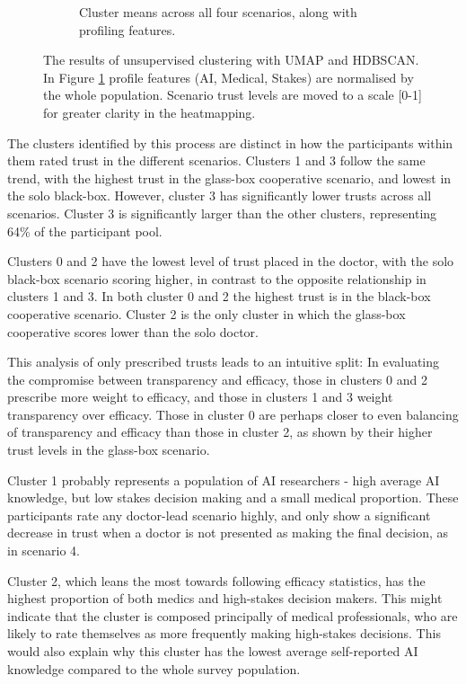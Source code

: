 \documentclass[manuscript,screen,review]{acmart}
\begin{document}
\begin{figure}
\begin{subfigure}{0.55\textwidth}
  \caption{Cluster means across all four scenarios, along with profiling features.}
  \label{fig:cluster_means}
\end{subfigure}
\caption{The results of unsupervised clustering with UMAP and HDBSCAN. In Figure \ref{fig:cluster_means} profile features (AI, Medical, Stakes) are normalised by the whole population. Scenario trust levels are moved to a scale [0-1] for greater clarity in the heatmapping.}
\label{fig:test}
\end{figure}

The clusters identified by this process are distinct in how the participants within them rated trust in the different scenarios. Clusters 1 and 3 follow the same trend, with the highest trust in the glass-box cooperative scenario, and lowest in the solo black-box. However, cluster 3 has significantly lower trusts across all scenarios. Cluster 3 is significantly larger than the other clusters, representing 64\% of the participant pool.

Clusters 0 and 2 have the lowest level of trust placed in the doctor, with the solo black-box scenario scoring higher, in contrast to the opposite relationship in clusters 1 and 3. In both cluster 0 and 2 the highest trust is in the black-box cooperative scenario. Cluster 2 is the only cluster in which the glass-box cooperative scores lower than the solo doctor.

This analysis of only prescribed trusts leads to an intuitive split: In evaluating the compromise between transparency and efficacy, those in clusters 0 and 2 prescribe more weight to efficacy, and those in clusters 1 and 3 weight transparency over efficacy. Those in cluster 0 are perhaps closer to even balancing of transparency and efficacy than those in cluster 2, as shown by their higher trust levels in the glass-box scenario.

Cluster 1 probably represents a population of AI researchers - high average AI knowledge, but low stakes decision making and a small medical proportion. These participants rate any doctor-lead scenario highly, and only show a significant decrease in trust when a doctor is not presented as making the final decision, as in scenario 4.

Cluster 2, which leans the most towards following efficacy statistics, has the highest proportion of both medics and high-stakes decision makers. This might indicate that the cluster is composed principally of medical professionals, who are likely to rate themselves as more frequently making high-stakes decisions. This would also explain why this cluster has the lowest average self-reported AI knowledge compared to the whole survey population.
\end{document}
